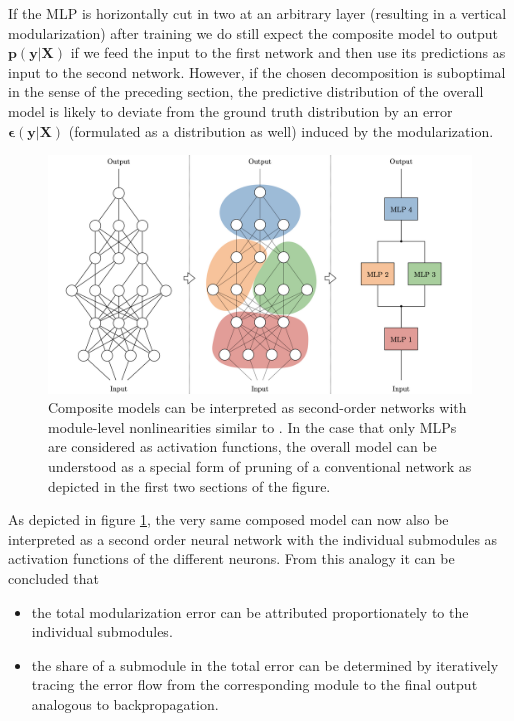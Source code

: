 If the MLP is horizontally cut in two at an arbitrary layer (resulting in a vertical modularization) after training we do still expect the composite model to output $\textbf{p}(\textbf{y}|\textbf{X})$ if we feed the input to the first network and then use its predictions as input to the second network. However, if the chosen decomposition is suboptimal in the sense of the preceding section, the predictive distribution of the overall model is likely to deviate from the ground truth distribution by an error $\boldsymbol{\epsilon}(\textbf{y}|\textbf{X})$ (formulated as a distribution as well) induced by the modularization.

\begin{figure}[tb]
    \centering
	    \includegraphics[width=\textwidth, trim=0 -25 0 -25, clip]{thesis/graphics/graphics/second_order_network.jpeg}
    \caption{Composite models can be interpreted as second-order networks with module-level nonlinearities similar to \cite{Lin2013-xh}. In the case that only MLPs are considered as activation functions, the overall model can be understood as a special form of pruning of a conventional network as depicted in the first two sections of the figure.}
    \label{fig:compnet_error_propagation_second_order_network}
\end{figure}

As depicted in figure \ref{fig:compnet_error_propagation_second_order_network}, the very same composed model can now also be interpreted as a second order neural network with the individual submodules as activation functions of the different neurons. From this analogy it can be concluded that

\begin{itemize}
    \item the total modularization error can be attributed proportionately to the individual submodules.
    \item the share of a submodule in the total error can be determined by iteratively tracing the error flow from the corresponding module to the final output analogous to backpropagation.
\end{itemize}

